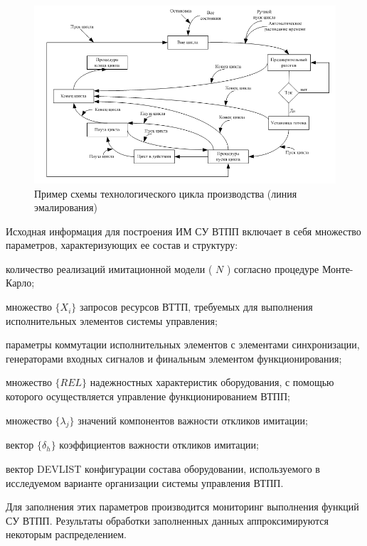 \begin{figure}[H]
	\includegraphics[scale=0.8]{images/part7/chapter_enterprise/line_ex.png}
	\caption{Пример схемы технологического цикла производства (линия эмалирования)}
	\label{fig:line_ex}
\end{figure}


Исходная информация для построения ИМ СУ ВТПП включает в себя множество параметров, характеризующих ее состав и структуру:
\begin{textitemize}
    \item количество реализаций имитационной модели ( $N$ ) согласно процедуре Монте-Карло;
    \item множество $\{X_i\}$ запросов ресурсов ВТТП, требуемых для выполнения исполнительных элементов системы управления;
    \item параметры коммутации исполнительных элементов с элементами синхронизации, генераторами входных сигналов и финальным элементом функционирования;
    \item множество $\{REL\}$ надежностных характеристик оборудования, с помощью которого осуществляется управление функционированием ВТПП;
    \item множество $\{ \lambda_j \}$ значений компонентов важности откликов имитации;
    \item вектор $\{ \delta_h \}$ коэффициентов важности откликов имитации;
    \item вектор {DEVLIST} конфигурации состава оборудовании, используемого в исследуемом варианте организации системы управления ВТПП.
\end{textitemize}

Для заполнения этих параметров производится мониторинг выполнения функций СУ ВТПП. Результаты обработки заполненных данных аппроксимируются некоторым распределением.

